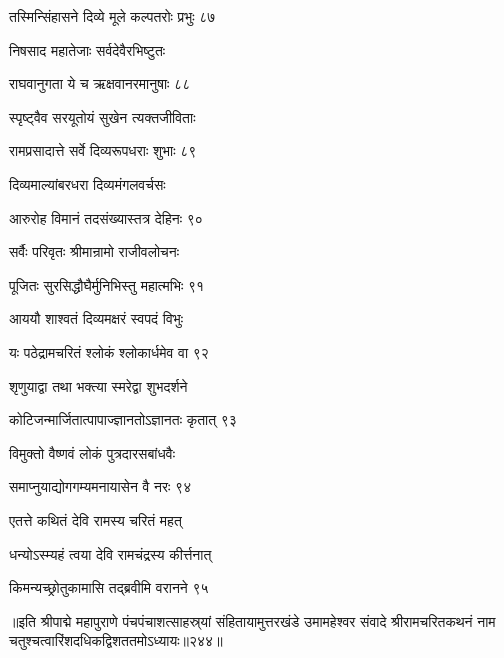 तस्मिन्सिंहासने दिव्ये मूले कल्पतरोः प्रभुः ८७

निषसाद महातेजाः सर्वदेवैरभिष्टुतः

राघवानुगता ये च ऋक्षवानरमानुषाः ८८

स्पृष्ट्वैव सरयूतोयं सुखेन त्यक्तजीविताः

रामप्रसादात्ते सर्वे दिव्यरूपधराः शुभाः ८९

दिव्यमाल्यांबरधरा दिव्यमंगलवर्चसः

आरुरोह विमानं तदसंख्यास्तत्र देहिनः ९०

सर्वैः परिवृतः श्रीमान्रामो राजीवलोचनः

पूजितः सुरसिद्धौघैर्मुनिभिस्तु महात्मभिः ९१

आययौ शाश्वतं दिव्यमक्षरं स्वपदं विभुः

यः पठेद्रामचरितं श्लोकं श्लोकार्धमेव वा ९२

शृणुयाद्वा तथा भक्त्या स्मरेद्वा शुभदर्शने

कोटिजन्मार्जितात्पापाज्ज्ञानतोऽज्ञानतः कृतात् ९३

विमुक्तो वैष्णवं लोकं पुत्रदारसबांधवैः

समाप्नुयाद्योगगम्यमनायासेन वै नरः ९४

एतत्ते कथितं देवि रामस्य चरितं महत्

धन्योऽस्म्यहं त्वया देवि रामचंद्रस्य कीर्त्तनात्

किमन्यच्छ्रोतुकामासि तद्ब्रवीमि वरानने ९५

॥इति श्रीपाद्मे महापुराणे पंचपंचाशत्साहस्र्यां संहितायामुत्तरखंडे उमामहेश्वर संवादे श्रीरामचरितकथनं नाम चतुश्चत्वारिंशदधिकद्विशततमोऽध्यायः॥२४४॥


